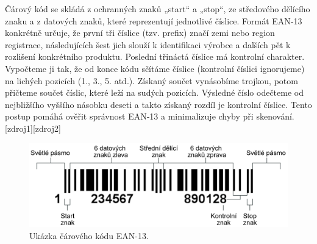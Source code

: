 




Čárový kód se skládá z ochranných znaků „start“ a „stop“, ze středového dělícího znaku a z datových znaků, které reprezentují jednotlivé číslice. Formát EAN‑13 konkrétně určuje, že první tři číslice (tzv. prefix) značí zemi nebo region registrace, následujících šest jich slouží k identifikaci výrobce a dalších pět k rozlišení konkrétního produktu. Poslední třináctá číslice má kontrolní charakter. Vypočteme ji tak, že od konce kódu sčítáme číslice (kontrolní číslici ignorujeme) na lichých pozicích (1., 3., 5. atd.). Získaný součet vynásobíme trojkou, potom přičteme součet číslic, které leží na sudých pozicích. Výsledné číslo odečteme od nejbližšího vyššího násobku deseti a takto získaný rozdíl je kontrolní číslice. Tento postup pomáhá ověřit správnost EAN‑13 a minimalizuje chyby při skenování. [zdroj1][zdroj2]

\begin{figure}[!h]
    \begin{center}
        \includegraphics[scale=0.15]{obrazky/čárový kód.png} %
    \end{center}
    \caption{Ukázka čárového kódu EAN-13.}
    \label{čárový kod}
\end{figure}






